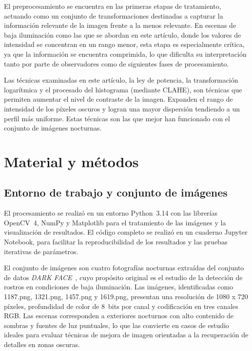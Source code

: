 \documentclass[12pt,a4paper,twoside]{rho-class/rho}
\begin{document}
    El preprocesamiento se encuentra en las primeras etapas de tratamiento, 
    actuando como un conjunto de transformaciones destinadas a capturar la información relevante 
    de la imagen frente a la menos relevante. En escenas de baja iluminación como las que se abordan en este artículo, donde los valores de intensidad se concentran en  un rango menor,
    esta etapa es especialmente crítica, ya que la información se encuentra comprimida, lo que dificulta su interpretación tanto por parte de observadores como de siguientes fases de procesamiento.

    Las técnicas examinadas en este artículo, la ley de potencia, la transformación
    logarítmica y el procesado del histograma (mediante CLAHE), son técnicas que permiten aumentar el nivel de contraste de la imagen. Expanden el rango de intensidad de los píxeles oscuros y logran una mayor dispersión tendiendo a un perfil más uniforme. 
    Estas técnicas son las que mejor han funcionado con el conjunto de imágenes nocturnas.


\section{Material y métodos}

    \subsection{Entorno de trabajo y conjunto de imágenes}

        El procesamiento se realizó en un entorno Python~3.14 con las librerías
        OpenCV~4, NumPy y Matplotlib para el tratamiento de las imágenes y la visualización de resultados. El código
        completo se realizó en un cuaderno Jupyter Notebook, para facilitar la reproducibilidad de los resultados y las pruebas iterativas de parámetros.

        El conjunto de imágenes son cuatro fotografías nocturnas extraídas
        del conjunto de datos \textit{DARK FACE}~\parencite{yang2020darkface}, cuyo
        propósito original es el estudio de la detección de rostros en condiciones
        de baja iluminación. Las imágenes, identificadas como 1187.png, 1321.png,
        1457.png y 1619.png, presentan una resolución de 1080 x 720 píxeles,
        profundidad de color de 8~bits por canal y codificación en tres canales RGB.
        Las escenas corresponden a exteriores nocturnos con alto
        contenido de sombras y fuentes de luz puntuales, lo que las convierte en casos de estudio ideales para evaluar técnicas de mejora de imagen orientadas a la recuperación de detalles en zonas oscuras.
\end{document}
